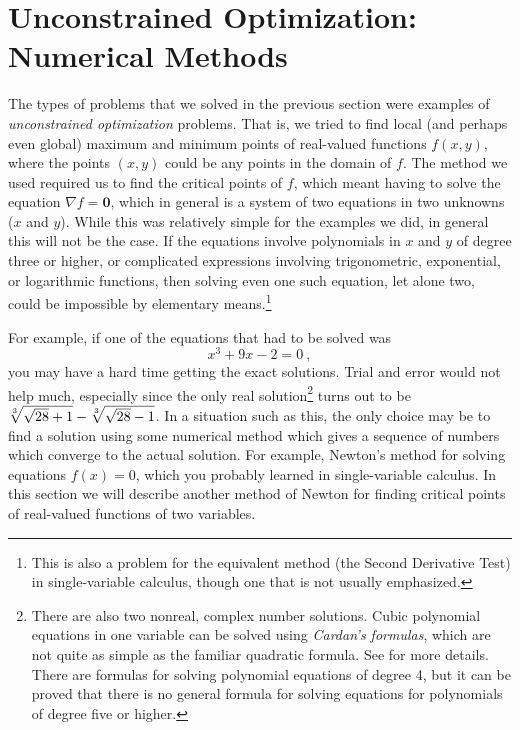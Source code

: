 \section{Unconstrained Optimization: Numerical Methods}
The types of problems that we solved in the previous section were examples of \emph{unconstrained optimization}
problems. That is, we tried to find local (and perhaps even global) maximum and minimum points of real-valued
functions $f(x,y)$, where the points $(x,y)$ could be any points in the domain of $f$. The method we used
required us to find the critical points of $f$, which meant having to solve the equation
$\nabla f = \textbf{0}$, which in general is a system of two equations in two unknowns ($x$ and $y$). While this
was relatively simple for the examples we did, in general this will not be the case. If the equations involve
polynomials in $x$ and $y$ of degree three or higher, or complicated expressions involving trigonometric,
exponential, or logarithmic functions, then solving even one such equation, let alone two, could be impossible
by elementary means.\footnote{This is also a problem
for the equivalent method (the Second Derivative Test) in single-variable calculus, though one that is not usually
emphasized.}

For example, if one of the equations that had to be solved was
\begin{displaymath}
 x^3 + 9x - 2 = 0 ~,
\end{displaymath}
you may have a hard time getting the exact solutions. Trial and error would not help much, especially
since the only real solution\footnote{There are
also two nonreal, complex number solutions. Cubic polynomial equations in one variable can be solved using
\emph{Cardan's formulas}, which are not quite as simple as the familiar quadratic formula. See \cite{usp} for
more details. There are formulas for solving polynomial equations of degree 4, but it can be proved that there is no
general formula for solving equations for polynomials of degree five or higher.} turns out to be
$\sqrt[3]{\smash[b]{\sqrt{28}} + 1} - \sqrt[3]{\smash[b]{\sqrt{28}} - 1}$. In a situation such as this, the
only choice may be to find a solution using some numerical method which gives a sequence of numbers which
converge to the actual solution. For example, Newton's method for solving equations $f(x) = 0$, which you probably
learned in single-variable calculus. In this section we will describe another method of Newton for
finding critical points of real-valued functions of two variables.

